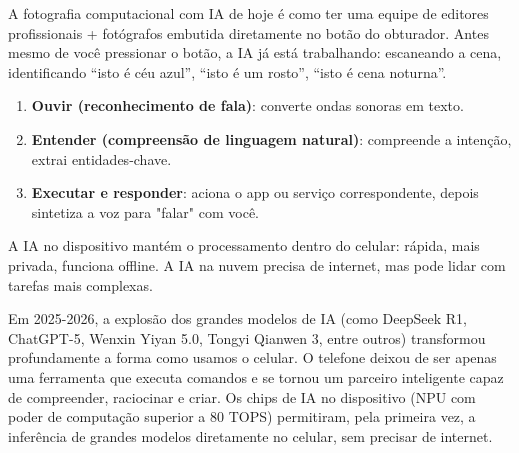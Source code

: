 


A fotografia computacional com IA de hoje é como ter uma equipe de editores profissionais + fotógrafos embutida diretamente no botão do obturador. Antes mesmo de você pressionar o botão, a IA já está trabalhando: escaneando a cena, identificando “isto é céu azul”, “isto é um rosto”, “isto é cena noturna”.


\begin{enumerate}
  \item \textbf{Ouvir (reconhecimento de fala)}: converte ondas sonoras em texto.
  \item \textbf{Entender (compreensão de linguagem natural)}: compreende a intenção, extrai entidades-chave.
  \item \textbf{Executar e responder}: aciona o app ou serviço correspondente, depois sintetiza a voz para "falar" com você.
\end{enumerate}


A IA no dispositivo mantém o processamento dentro do celular: rápida, mais privada, funciona offline. A IA na nuvem precisa de internet, mas pode lidar com tarefas mais complexas.


Em 2025-2026, a explosão dos grandes modelos de IA (como DeepSeek R1, ChatGPT-5, Wenxin Yiyan 5.0, Tongyi Qianwen 3, entre outros) transformou profundamente a forma como usamos o celular. O telefone deixou de ser apenas uma ferramenta que executa comandos e se tornou um parceiro inteligente capaz de compreender, raciocinar e criar. Os chips de IA no dispositivo (NPU com poder de computação superior a 80 TOPS) permitiram, pela primeira vez, a inferência de grandes modelos diretamente no celular, sem precisar de internet.

